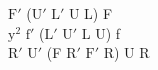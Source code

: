 $\text{F}'$ ($\text{U}'$ $\text{L}'$ U L) F\\
$\text{y}^2$ $\text{f}'$ ($\text{L}'$ $\text{U}'$ L U) f\\
$\text{R}'$ $\text{U}'$ (F $\text{R}'$ $\text{F}'$ R) U R\\
